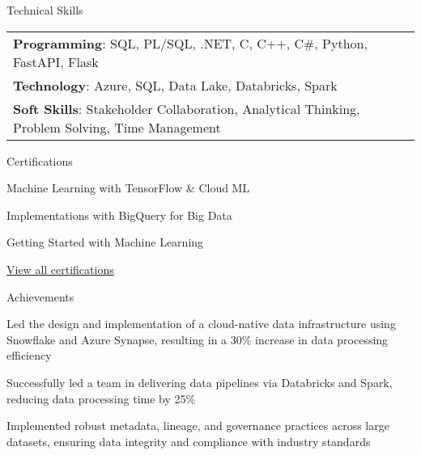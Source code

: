 \documentclass{resume} %
\begin{document}
    \begin{rSection}{Technical Skills}
        \begin{tabular}{ @{} l @{	} l }
                                \textbf{Programming}: SQL, PL/SQL, .NET, C, C++, C\#, Python, FastAPI, Flask\\
                                \textbf{Technology}: Azure, SQL, Data Lake, Databricks, Spark\\
                                \textbf{Soft Skills}: Stakeholder Collaboration, Analytical Thinking, Problem Solving, Time Management\\
        \end{tabular}
    \end{rSection}

    \begin{rSection}{Certifications}
        \begin{rSubsection}{}{}{}
                            \item Machine Learning with TensorFlow \& Cloud ML
                            \item Implementations with BigQuery for Big Data
                            \item Getting Started with Machine Learning
                    \end{rSubsection}
        \href{https://skillsoft.digitalbadges.skillsoft.com/profile/umairsaeed185770/wallet}{View all certifications}
    \end{rSection}

    \begin{rSection}{Achievements}
        \begin{rSubsection}{}{}{}
                            \item Led the design and implementation of a cloud{-}native data infrastructure using Snowflake and Azure Synapse, resulting in a 30\% increase in data processing efficiency
                            \item Successfully led a team in delivering data pipelines via Databricks and Spark, reducing data processing time by 25\%
                            \item Implemented robust metadata, lineage, and governance practices across large datasets, ensuring data integrity and compliance with industry standards
                    \end{rSubsection}
    \end{rSection}
\end{document}
